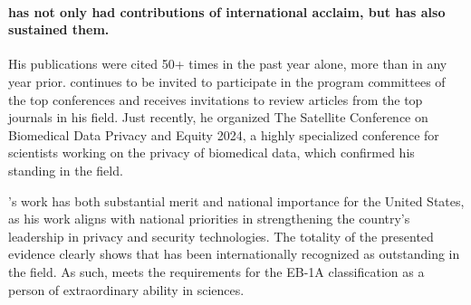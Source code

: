 \paragraph{\dr has not only had contributions of international acclaim, but has also sustained them.}
His publications were cited 50+ times in the past year alone, more than in
any year prior.
\dr continues to be invited to participate in the program committees of the
top conferences and receives invitations to review articles from the top
journals in his field.
Just recently, he organized The Satellite Conference on Biomedical
Data Privacy and Equity 2024, a highly specialized conference for scientists
working on the privacy of biomedical data, which confirmed his
standing in the field.

\dr's work has both substantial merit and national importance for the
United States, as his work aligns with national priorities in strengthening the
country's leadership in privacy and security technologies.
The totality of the presented evidence clearly shows that \dr has been
internationally recognized as outstanding in the field.
As such, \dr meets the requirements for the EB-1A classification as a person of
extraordinary ability in sciences.

